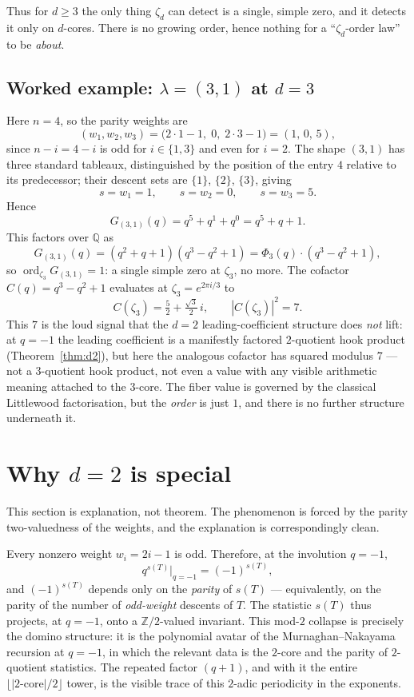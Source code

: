 \documentclass[11pt]{article}
\theoremstyle{definition}
\theoremstyle{remark}
\newcommand{\ord}{\operatorname{ord}}
\newcommand{\Q}{\mathbb{Q}}
\begin{document}
Thus for $d \ge 3$ the only thing $\zeta_d$ can detect is a single, simple zero, and
it detects it only on $d$-cores. There is no growing order, hence nothing for a
``$\zeta_d$-order law'' to be \emph{about}.

\subsection*{Worked example: $\lambda = (3,1)$ at $d=3$}

Here $n = 4$, so the parity weights are
\[
(w_1,w_2,w_3) = \big(2\cdot 1 - 1,\; 0,\; 2\cdot 3 - 1\big) = (1,\,0,\,5),
\]
since $n - i = 4 - i$ is odd for $i \in \{1,3\}$ and even for $i = 2$. The shape
$(3,1)$ has three standard tableaux, distinguished by the position of the entry $4$
relative to its predecessor; their descent sets are $\{1\}$, $\{2\}$, $\{3\}$, giving
\[
s = w_1 = 1, \qquad s = w_2 = 0, \qquad s = w_3 = 5.
\]
Hence
\[
G_{(3,1)}(q) = q^{5} + q^{1} + q^{0} = q^5 + q + 1.
\]
This factors over $\Q$ as
\[
G_{(3,1)}(q) = (q^2 + q + 1)(q^3 - q^2 + 1) = \Phi_3(q)\cdot(q^3 - q^2 + 1),
\]
so $\ord_{\zeta_3} G_{(3,1)} = 1$: a single simple zero at $\zeta_3$, no more. The
cofactor $C(q) = q^3 - q^2 + 1$ evaluates at $\zeta_3 = e^{2\pi i/3}$ to
\[
C(\zeta_3) = \tfrac{5}{2} + \tfrac{\sqrt 3}{2}\, i,
\qquad |C(\zeta_3)|^2 = 7.
\]
This $7$ is the loud signal that the $d=2$ leading-coefficient structure does
\emph{not} lift: at $q=-1$ the leading coefficient is a manifestly factored
$2$-quotient hook product (Theorem~\ref{thm:d2}), but here the analogous cofactor has
squared modulus $7$ --- not a $3$-quotient hook product, not even a value with any
visible arithmetic meaning attached to the $3$-core. The fiber value is governed by
the classical Littlewood factorisation, but the \emph{order} is just $1$, and there is
no further structure underneath it.

\section{Why $d=2$ is special}

This section is explanation, not theorem. The phenomenon is forced by the parity
two-valuedness of the weights, and the explanation is correspondingly clean.

Every nonzero weight $w_i = 2i-1$ is odd. Therefore, at the involution $q = -1$,
\[
q^{s(T)} \big|_{q=-1} = (-1)^{s(T)},
\]
and $(-1)^{s(T)}$ depends only on the \emph{parity} of $s(T)$ --- equivalently, on the
parity of the number of \emph{odd-weight} descents of $T$. The statistic $s(T)$ thus
projects, at $q=-1$, onto a $\mathbb{Z}/2$-valued invariant. This mod-$2$ collapse is
precisely the domino structure: it is the polynomial avatar of the Murnaghan--Nakayama
recursion at $q=-1$, in which the relevant data is the $2$-core and the parity of
$2$-quotient statistics. The repeated factor $(q+1)$, and with it the entire
$\lfloor |2\text{-core}|/2\rfloor$ tower, is the visible trace of this $2$-adic
periodicity in the exponents.
\end{document}
